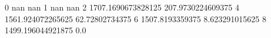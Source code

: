 0 nan nan
1 nan nan
2 1707.1690673828125 207.9730224609375
4 1561.924072265625 62.72802734375
6 1507.8193359375 8.623291015625
8 1499.196044921875 0.0
